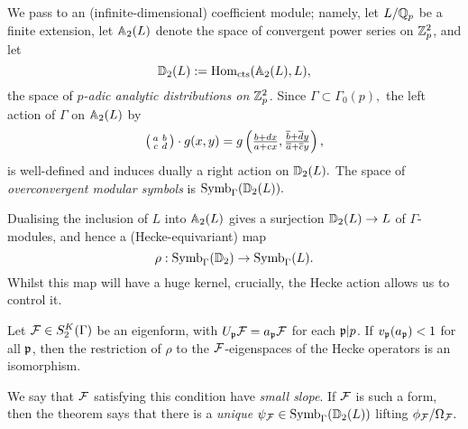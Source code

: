 \documentclass[a4paper,10pt]{article}
\numberwithin{equation}{section}
\begin{document}
We pass to an (infinite-dimensional) coefficient module; namely, let $L/\mathbb{Q}_p$ be a finite extension, let $\mathbb{A}_2(L)$ denote the space of convergent power series on $\mathbb{Z}_p^2$, and let
\[
    \mathbb{D}_2(L) := \mathrm{Hom}_{\mathrm{cts}}(\mathbb{A}_2(L),L),
\]
the space of \emph{$p$-adic analytic distributions on $\mathbb{Z}_p^2$.} Since $\Gamma \subset \Gamma_0(p),$ the left action of $\Gamma$ on $\mathbb{A}_2(L)$ by
\[
    \left(\begin{smallmatrix}a & b\\c & d\end{smallmatrix}\right) \cdot g(x,y) = g\left(\tfrac{b+dx}{a+cx}, \tfrac{\overline{b} + \overline{d}y}{\overline{a}+\overline{c}y}\right),
\]
is well-defined and induces dually a right action on $\mathbb{D}_2(L).$ The space of \emph{overconvergent modular symbols} is $\mathrm{Symb}_{\Gamma}(\mathbb{D}_2(L)).$

Dualising the inclusion of $L$ into $\mathbb{A}_2(L)$ gives a surjection $\mathbb{D}_2(L) \rightarrow L$ of $\Gamma$-modules, and hence a (Hecke-equivariant) map
\[
    \rho : \mathrm{Symb}_\Gamma(\mathbb{D}_2) \rightarrow \mathrm{Symb}_\Gamma(L).
\]
Whilst this map will have a huge kernel, crucially, the Hecke action allows us to control it.

\begin{theorem}\emph{\cite[Thm.~6.10]{Wil17}} \label{thm:control theorem}
Let $\mathcal{F} \in S_2^K(\Gamma)$ be an eigenform, with $U_{\mathfrak{p}}\mathcal{F} = a_{\mathfrak{p}}\mathcal{F}$ for each $\mathfrak{p}|p$. If $v_{\mathfrak{p}}(a_{\mathfrak{p}}) < 1$ for all $\mathfrak{p}$, then the restriction of $\rho$ to the $\mathcal{F}$-eigenspaces of the Hecke operators is an isomorphism.
\end{theorem}

We say that $\mathcal{F}$ satisfying this condition have \emph{small slope}. If $\mathcal{F}$ is such a form, then the theorem says that there is a \emph{unique} $\psi_{\mathcal{F}} \in \mathrm{Symb}_\Gamma(\mathbb{D}_2(L))$ lifting $\phi_{\mathcal{F}}/\Omega_{\mathcal{F}}.$

\end{document}

